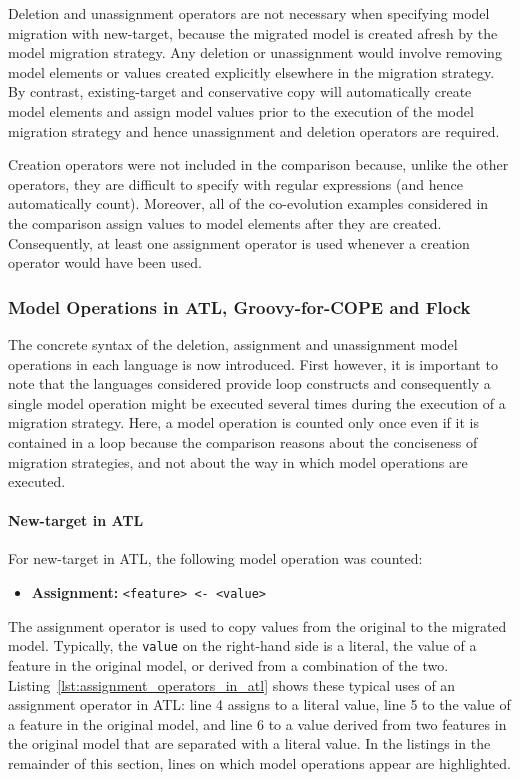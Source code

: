 Deletion and unassignment operators are not necessary when specifying model migration with new-target, because the migrated model is created afresh by the model migration strategy. Any deletion or unassignment would involve removing model elements or values created explicitly elsewhere in the migration strategy. By contrast, existing-target and conservative copy will automatically create model elements and assign model values prior to the execution of the model migration strategy and hence unassignment and deletion operators are required.

Creation operators were not included in the comparison because, unlike the other operators, they are difficult to specify with regular expressions (and hence automatically count). Moreover, all of the co-evolution examples considered in the comparison assign values to model elements after they are created. Consequently, at least one assignment operator is used whenever a creation operator would have been used.

\subsubsection{Model Operations in ATL, Groovy-for-COPE and Flock}
\label{subsubsec:quantitive_model_operations_concrete}
The concrete syntax of the deletion, assignment and unassignment model operations in each language is now introduced. First however, it is important to note that the languages considered provide loop constructs and consequently a single model operation might be executed several times during the execution of a migration strategy. Here, a model operation is counted only once even if it is contained in a loop because the comparison reasons about the conciseness of migration strategies, and not about the way in which model operations are executed.

\paragraph{New-target in ATL}
For new-target in ATL, the following model operation was counted:
	
\begin{itemize}
	\item \textbf{Assignment:}
	\subitem \texttt{<feature> <- <value>} 
\end{itemize}

The assignment operator is used to copy values from the original to the migrated model. Typically, the \texttt{value} on the right-hand side is a literal, the value of a feature in the original model, or derived from a combination of the two. Listing~\ref{lst:assignment_operators_in_atl} shows these typical uses of an assignment operator in ATL: line 4 assigns to a literal value, line 5 to the value of a feature in the original model, and line 6 to a value derived from two features in the original model that are separated with a literal value. In the listings in the remainder of this section, lines on which model operations appear are highlighted.


